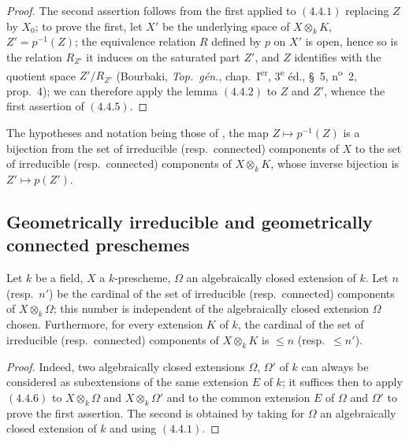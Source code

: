 \begin{proof}
The second assertion follows from the first applied to $(4.4.1)$ replacing $Z$ by $X_0$; to prove the first, let $X'$ be the underlying space of $X\otimes_k K$, $Z'=p^{-1}(Z)$; the equivalence relation $R$ defined by $p$ on $X'$ is open, hence so is the relation $R_{Z'}$ it induces on the saturated part $Z'$, and $Z$ identifies with the quotient space $Z'/R_{Z'}$ (Bourbaki, \emph{Top.\ g\'en.}, chap.~I\textsuperscript{er}, 3\textsuperscript{e} \'ed., \S~5, n\textsuperscript{o}~2, prop.~4); we can therefore apply the lemma $(4.4.2)$ to $Z$ and $Z'$, whence the first assertion of $(4.4.5)$.
\end{proof}


\begin{corollary}[4.4.6]
\label{IV.4.4.6}
The hypotheses and notation being those of , the map $Z\mapsto p^{-1}(Z)$ is a bijection from the set of irreducible (resp.\ connected) components of $X$ to the set of irreducible (resp.\ connected) components of $X\otimes_k K$, whose inverse bijection is $Z'\mapsto p(Z')$.
\end{corollary}

\subsection{Geometrically irreducible and geometrically connected preschemes}
\label{subsection:IV.4.5}

\begin{proposition}[4.5.1]
\label{IV.4.5.1}
Let $k$ be a field, $X$ a $k$-prescheme, $\Omega$ an algebraically closed extension of $k$.
Let $n$ (resp.\ $n'$) be the cardinal of the set of irreducible (resp.\ connected) components of $X\otimes_k\Omega$; this number is independent of the algebraically closed extension $\Omega$ chosen.
Furthermore, for every extension $K$ of $k$, the cardinal of the set of irreducible (resp.\ connected) components of $X\otimes_k K$ is $\leq n$ (resp.\ $\leq n'$).
\end{proposition}

\begin{proof}
Indeed, two algebraically closed extensions $\Omega$, $\Omega'$ of $k$ can always be considered as subextensions of the same extension $E$ of $k$; it suffices then to apply $(4.4.6)$ to $X\otimes_k\Omega$ and $X\otimes_k\Omega'$ and to the common extension $E$ of $\Omega$ and $\Omega'$ to prove the first assertion.
The second is obtained by taking for $\Omega$ an algebraically closed extension of $k$ and using $(4.4.1)$.
\end{proof}

